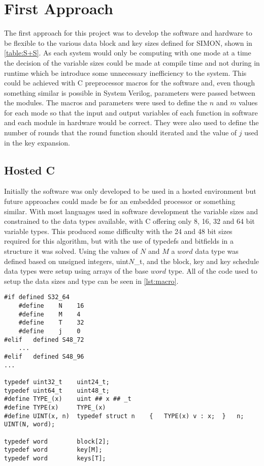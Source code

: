 \documentclass[12pt,twoside,a4paper]{report}
\begin{document}
	\section{First Approach}
	\label{section:first}
	The first approach for this project was to develop the software and hardware to be flexible to the various data block and key sizes defined for SIMON, shown in \autoref{table:S+S}. As each system would only be computing with one mode at a time the decision of the variable sizes could be made at compile time and not during in runtime which be introduce some unnecessary inefficiency to the system. This could be achieved with C preprocessor macros for the software and, even though something similar is possible in System Verilog, parameters were passed between the modules. The macros and parameters were used to define the $n$ and $m$ values for each mode so that the input and output variables of each function in software and each module in hardware would be correct. They were also used to define the number of rounds that the round function should iterated and the value of $j$ used in the key expansion.
    
	\subsection{Hosted C}
	\label{subsection:HOSTED1}
	Initially the software was only developed to be used in a hosted environment but future approaches could made be for an embedded processor or something similar. With most languages used in software development the variable sizes and constrained to the data types available, with C offering only 8, 16, 32 and 64 bit variable types. This produced some difficulty with the 24 and 48 bit sizes required for this algorithm, but with the use of typedefs and bitfields in a structure it was solved. Using the values of $N$ and $M$ a $word$ data type was defined based on unsigned integers, uint$N$\_t, and the block, key and key schedule data types were setup using arrays of the base $word$ type. All of the code used to setup the data sizes and type can be seen in \autoref{lst:macro}.
    
	\begin{lstlisting}[label={lst:macro},caption={Macro definition of the word, block, key and key schedule types.},style=CStyle]
#if	defined	S32_64
    #define    N    16
    #define    M    4
    #define    T    32
    #define    j    0
#elif	defined S48_72
    ...
#elif	defined S48_96
...

typedef uint32_t	uint24_t;
typedef uint64_t	uint48_t;
#define TYPE_(x)	uint ## x ## _t
#define TYPE(x)		TYPE_(x)
#define UINT(x, n)	typedef struct n	{	TYPE(x) v : x;	}	n;
UINT(N, word);

typedef word 		block[2];
typedef word 		key[M];
typedef word		keys[T];
	\end{lstlisting}
    
\end{document}
